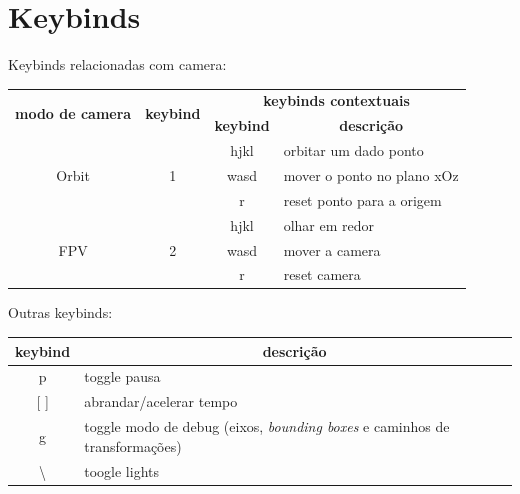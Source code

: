 \documentclass[a4paper]{report}
\begin{document}
\section{Keybinds}
Keybinds relacionadas com camera:
\begin{table}[H]
\begin{tabular}{|c|c|c|l|}
\hline
\multirow{2}{*}{\textbf{modo de camera}} & \multirow{2}{*}{\textbf{keybind}} & \multicolumn{2}{c|}{\textbf{keybinds contextuais}} \\ \cline{3-4} 
                       &                    & \textbf{keybind} & \multicolumn{1}{c|}{\textbf{descrição}} \\ \hline
\multirow{3}{*}{Orbit} & \multirow{3}{*}{1} & hjkl             & orbitar um dado ponto                   \\ \cline{3-4} 
                       &                    & wasd             & mover o ponto no plano xOz              \\ \cline{3-4} 
                       &                    & r                & reset ponto para a origem               \\ \hline
\multirow{3}{*}{FPV}   & \multirow{3}{*}{2} & hjkl             & olhar em redor                          \\ \cline{3-4} 
                       &                    & wasd             & mover a camera                          \\ \cline{3-4} 
                       &                    & r                & reset camera                            \\ \hline
\end{tabular}
\end{table}
Outras keybinds:

\begin{table}[H]
\begin{tabular}{|c|l|}
\hline
\textbf{keybind} & \multicolumn{1}{c|}{\textbf{descrição}}                   \\ \hline
p                & toggle pausa                                              \\ \hline
{[} {]}          & abrandar/acelerar tempo                                   \\ \hline
g                & toggle modo de debug (eixos, \textit{bounding boxes} e caminhos de transformações) \\ \hline
\textbackslash   & toogle lights \\ \hline
\end{tabular}
\end{table}
\end{document}
